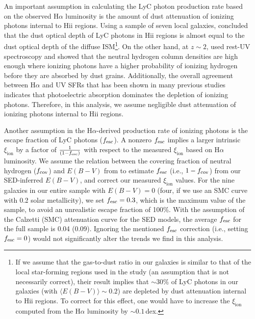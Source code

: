 \documentclass[iop]{emulateapj}
\newcommand{\xiion}{\ensuremath{\xi_{\mathrm{ion}}}}
\newcommand{\halpha}{H\ensuremath{\alpha}}
\begin{document}
An important assumption in calculating the LyC photon production rate based on the observed {\halpha} luminosity is the amount of dust attenuation of ionizing photons internal to H{\sc ii} regions. Using a sample of seven local galaxies, \citet{inoue02} concluded that the dust optical depth of LyC photons in H{\sc ii} regions is almost equal to the dust optical depth of the diffuse ISM\footnote{If we assume that the gas-to-dust ratio in our galaxies is similar to that of the local star-forming regions used in the \citet{inoue02} study (an assumption that is not necessarily correct), their result implies that $\sim 30\%$ of LyC photons in our galaxies (with $\langle E(B-V)\rangle \sim 0.2$) are depleted by dust attenuation internal to H{\sc ii} regions. To correct for this effect, one would have to increase the {\xiion} computed from the H$\alpha$ luminosity by $\sim 0.1$\,dex.}. On the other hand, at $z\sim 2$, \citet{reddy16a} used rest-UV spectroscopy and showed that the neutral hydrogen column densities are high enough where ionizing photons have a higher probability of ionizing hydrogen before they are absorbed by dust grains. Additionally, the overall agreement between {\halpha} and UV SFRs that has been shown in many previous studies \citep[e.g.,][]{erb06c,shivaei15a,shivaei15b} indicates that photoelectric absorption dominates the depletion of ionizing photons. Therefore, in this analysis, we assume negligible dust attenuation of ionizing photons internal to H{\sc ii} regions. 

Another assumption in the {\halpha}-derived production rate of ionizing photons is the escape fraction of LyC photons ($f_{\rm esc}$). A nonzero $f_{\rm esc}$ implies a larger intrinsic {\xiion} by a factor of $\frac{1}{(1-f_{\rm esc})}$ with respect to the measured {\xiion} based on {\halpha} luminosity. We assume the relation between the covering fraction of neutral hydrogen ($f_{\rm cov}$) and $E(B-V)$ from \citet{reddy16b} to estimate $f_{\rm esc}$ (i.e., $1 - f_{\rm cov}$) from our SED-inferred $E(B-V)$, and correct our measured {\xiion} values.
For the nine galaxies in our entire sample with $E(B-V)=0$ (four, if we use an SMC curve with 0.2 solar metallicity), we set $f_{\rm esc}=0.3$, which is the maximum value of the sample, to avoid an unrealistic escape fraction of 100\%. 
With the assumption of the Calzetti (SMC) attenuation curve for the SED models, the average $f_{\rm esc}$ for the full sample is 0.04 (0.09). Ignoring the mentioned $f_{\rm esc}$ correction (i.e., setting $f_{\rm esc}=0$) would not significantly alter the trends we find in this analysis.
\end{document}
